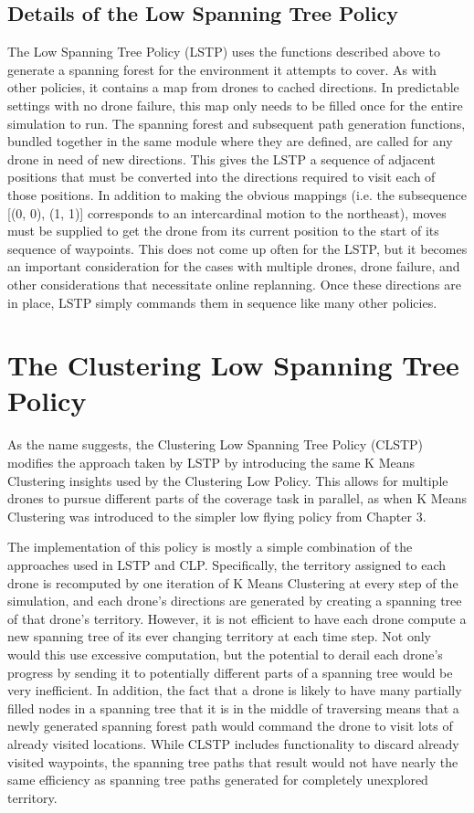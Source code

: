 \subsection{Details of the Low Spanning Tree Policy}

The Low Spanning Tree Policy (LSTP) uses the functions described above to generate a spanning forest for the environment it attempts to cover. As with other policies, it contains a map from drones to cached directions. In predictable settings with no drone failure, this map only needs to be filled once for the entire simulation to run. The spanning forest and subsequent path generation functions, bundled together in the same module where they are defined, are called for any drone in need of new directions. This gives the LSTP a sequence of adjacent positions that must be converted into the directions required to visit each of those positions. In addition to making the obvious mappings (i.e. the subsequence [(0, 0), (1, 1)] corresponds to an intercardinal motion to the northeast), moves must be supplied to get the drone from its current position to the start of its sequence of waypoints. This does not come up often for the LSTP, but it becomes an important consideration for the cases with multiple drones, drone failure, and other considerations that necessitate online replanning. Once these directions are in place, LSTP simply commands them in sequence like many other policies.

\section{The Clustering Low Spanning Tree Policy}

As the name suggests, the Clustering Low Spanning Tree Policy (CLSTP) modifies the approach taken by LSTP by introducing the same K Means Clustering insights used by the Clustering Low Policy. This allows for multiple drones to pursue different parts of the coverage task in parallel, as when K Means Clustering was introduced to the simpler low flying policy from Chapter 3.

The implementation of this policy is mostly a simple combination of the approaches used in LSTP and CLP. Specifically, the territory assigned to each drone is recomputed by one iteration of K Means Clustering at every step of the simulation, and each drone's directions are generated by creating a spanning tree of that drone's territory. However, it is not efficient to have each drone compute a new spanning tree of its ever changing territory at each time step. Not only would this use excessive computation, but the potential to derail each drone's progress by sending it to potentially different parts of a spanning tree would be very inefficient. In addition, the fact that a drone is likely to have many partially filled nodes in a spanning tree that it is in the middle of traversing means that a newly generated spanning forest path would command the drone to visit lots of already visited locations. While CLSTP includes functionality to discard already visited waypoints, the spanning tree paths that result would not have nearly the same efficiency as spanning tree paths generated for completely unexplored territory.

